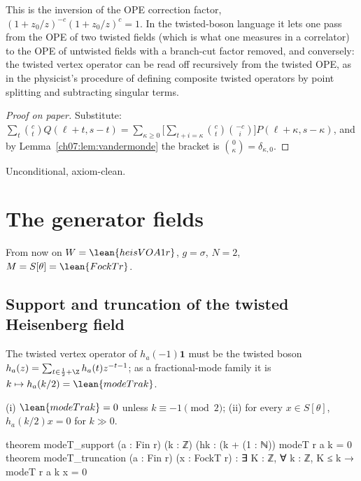 \begin{physics}
This is the inversion of the OPE correction factor, $(1+z_0/z)^{-c}(1+z_0/z)^{c}=1$. In the twisted-boson language it lets one pass from the OPE of two twisted fields (which is what one measures in a correlator) to the OPE of untwisted fields with a branch-cut factor removed, and conversely: the twisted vertex operator can be read off recursively from the twisted OPE, as in the physicist's procedure of defining composite twisted operators by point splitting and subtracting singular terms.
\end{physics}

\begin{proof}[Proof on paper]
Substitute: $\sum_t\binom ct Q(\ell+t,s-t) = \sum_{\kappa\ge0}\bigl[\sum_{t+i=\kappa}\binom ct
\binom{-c}{i}\bigr]P(\ell+\kappa,s-\kappa)$, and by Lemma~\ref{ch07:lem:vandermonde} the bracket
is $\binom{0}{\kappa} = \delta_{\kappa,0}$.
\end{proof}

\begin{status}
Unconditional, axiom-clean.
\end{status}

\section{The generator fields}\label{ch07:sec:generators}

From now on $W = \lean{heisVOA1 r}$, $g = \sigma$, $N=2$, $M = S[\theta] = \lean{FockT r}$.

\subsection{Support and truncation of the twisted Heisenberg field}

The twisted vertex operator of $h_a(-1)\mathbf 1$ must be the twisted boson $h_a(z) =
\sum_{t\in\frac12+\Z}h_a(t)z^{-t-1}$; as a fractional-mode family it is $k\mapsto h_a(k/2) =
\lean{modeT r a k}$.

\begin{proposition}\label{ch07:prop:gensupport}
(i) $\lean{modeT r a k} = 0$ unless $k\equiv -1\pmod 2$; (ii) for every $x\in S[\theta]$,
$h_a(k/2)x = 0$ for $k\gg0$.
\end{proposition}

\begin{leancode}
theorem modeT_support (a : Fin r) (k : ℤ) (hk : (k + (1 : ℕ)) %
    modeT r a k = 0
theorem modeT_truncation (a : Fin r) (x : FockT r) :
    ∃ K : ℤ, ∀ k : ℤ, K ≤ k → modeT r a k x = 0
\end{leancode}

